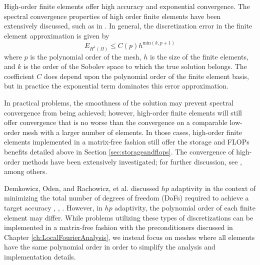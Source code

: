 High-order finite elements offer high accuracy and exponential convergence.
The spectral convergence properties of high order finite elements have been extensively discussed, such as in \cite{guo1986hp}.
In general, the discretization error in the finite element approximation is given by
\begin{equation}
E_{H^1 \left( \Omega \right)} \leq C \left( p \right) h^{\text{min} \left( k, p + 1 \right)}
\label{eq:spectral_convergence}
\end{equation}
where $p$ is the polynomial order of the mesh, $h$ is the size of the finite elements, and $k$ is the order of the Sobolev space to which the true solution belongs.
The coefficient $C$ does depend upon the polynomial order of the finite element basis, but in practice the exponential term dominates this error approximation.

In practical problems, the smoothness of the solution may prevent spectral convergence from being achieved; however, high-order finite elements will still offer convergence that is no worse than the convergence on a comparable low-order mesh with a larger number of elements.
In those cases, high-order finite elements implemented in a matrix-free fashion still offer the storage and FLOPs benefits detailed above in Section \ref{sec:storageandflops}.
The convergence of high-order methods have been extensively investigated; for further discussion, see \cite{babuska1982rates}, among others.

Demkowicz, Oden, and Rachowicz, et al. discussed $hp$ adaptivity in the context of minimizing the total number of degrees of freedom (DoFs) required to achieve a target accuracy \cite{demkowicz1989toward}, \cite{oden1989toward}, \cite{rachowicz1989toward}.
However, in $hp$ adaptivity, the polynomial order of each finite element may differ.
While problems utilizing these types of discretizations can be implemented in a matrix-free fashion with the preconditioners discussed in Chapter \ref{ch:LocalFourierAnalysis}, we instead focus on meshes where all elements have the same polynomial order in order to simplify the analysis and implementation details.

